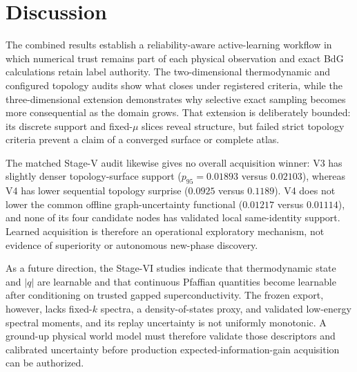 \section{Discussion}
The combined results establish a reliability-aware active-learning workflow in which numerical trust remains part of each physical observation and exact BdG calculations retain label authority. The two-dimensional thermodynamic and configured topology audits show what closes under registered criteria, while the three-dimensional extension demonstrates why selective exact sampling becomes more consequential as the domain grows. That extension is deliberately bounded: its discrete support and fixed-$\mu$ slices reveal structure, but failed strict topology criteria prevent a claim of a converged surface or complete atlas.

The matched Stage-V audit likewise gives no overall acquisition winner: V3 has slightly denser topology-surface support ($p_{95}=0.01893$ versus $0.02103$), whereas V4 has lower sequential topology surprise ($0.0925$ versus $0.1189$). V4 does not lower the common offline graph-uncertainty functional ($0.01217$ versus $0.01114$), and none of its four candidate nodes has validated local same-identity support. Learned acquisition is therefore an operational exploratory mechanism, not evidence of superiority or autonomous new-phase discovery.

As a future direction, the Stage-VI studies indicate that thermodynamic state and $|q|$ are learnable and that continuous Pfaffian quantities become learnable after conditioning on trusted gapped superconductivity. The frozen export, however, lacks fixed-$k$ spectra, a density-of-states proxy, and validated low-energy spectral moments, and its replay uncertainty is not uniformly monotonic. A ground-up physical world model must therefore validate those descriptors and calibrated uncertainty before production expected-information-gain acquisition can be authorized.
